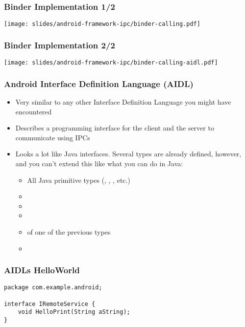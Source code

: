 \begin{frame}
  \frametitle{Binder Implementation 1/2}
  \begin{center}
    \texttt{[image: slides/android-framework-ipc/binder-calling.pdf]}
  \end{center}
\end{frame}

\begin{frame}
  \frametitle{Binder Implementation 2/2}
  \begin{center}
    \texttt{[image: slides/android-framework-ipc/binder-calling-aidl.pdf]}
  \end{center}
\end{frame}

\begin{frame}
  \frametitle{Android Interface Definition Language (AIDL)}
  \begin{itemize}
  \item Very similar to any other Interface Definition Language you
    might have encountered
  \item Describes a programming interface for the client and the
    server to communicate using IPCs
  \item Looks a lot like Java interfaces. Several types are already
    defined, however, and you can't extend this like what you can do in
    Java:
    \begin{itemize}
    \item All Java primitive types (, ,
      , etc.)
    \item {}
    \item {}
    \item {}
    \item {} of one of the previous types
    \item {}
    \end{itemize}
  \end{itemize}
\end{frame}

\begin{frame}[fragile]
  \frametitle{AIDLs HelloWorld}
\begin{verbatim}
package com.example.android;

interface IRemoteService {
    void HelloPrint(String aString);
}
\end{verbatim}
\end{frame}

